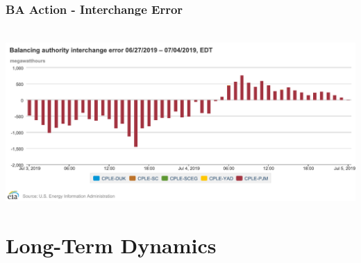 \documentclass[14pt, unknownkeysallowed]{beamer}
\begin{document}
\begin{frame}
\frametitle{BA Action - Interchange Error} \ \vspace{.5em}
{\centering
{\includegraphics[height=.6\textheight]{chart4}} %
}
\end{frame}

\section{Long-Term Dynamics}
\end{document}
